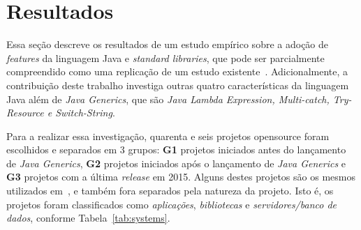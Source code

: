 \section{Resultados}

Essa se\c c\~{a}o descreve os resultados de 
um estudo emp\'{i}rico sobre a adoção de \textit{features} da 
linguagem Java e \textit{standard libraries}, que pode 
ser parcialmente compreendido como uma replicação de um estudo 
existente~\cite{Parnin:ACM2011}. Adicionalmente, a contribuição deste trabalho 
investiga outras quatro características da linguagem Java além de \textit{Java Generics}, 
que são \textit{Java Lambda Expression, Multi-catch, Try-Resource e Switch-String}.  



Para a realizar essa investigação, quarenta e seis projetos opensource foram escolhidos e separados em 3 
grupos: \textbf{G1} projetos iniciados antes do lançamento de \textit{Java Generics}, \textbf{G2} projetos iniciados 
após o lançamento de \textit{Java Generics} e \textbf{G3} projetos com a última \textit{release} em 2015. 
Alguns destes projetos são os mesmos utilizados em~\cite{Parnin:ACM2011, Dyer:ACM2014, ward2015performance}, 
e também fora separados pela natureza da projeto. Isto \'{e}, os projetos foram 
classificados como \emph{aplicações}, \emph{bibliotecas} e \emph{servidores/banco de dados}, 
conforme Tabela~\ref{tab:systems}. 

